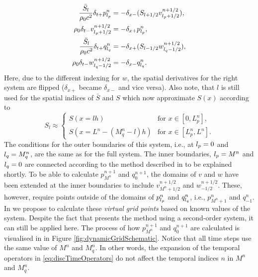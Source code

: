 \begin{subequations}\label{eq:firstOrderPairs}
    \begin{align}
        \frac{\bar S_{l}}{\rho_0 c^2}\delta_{t+}p_{l_p}^n &= -\delta_{x-}(S_{{l}+1/2}v_{{l_p}+1/2}^{n+1/2}),\label{eq:discPressureP}\\
        \rho_0 \delta_{t-}v_{{l_p}+1/2}^{n+1/2}&=-\delta_{x+}p_{l_p}^n,\label{eq:discVelocityV}\\
        \frac{\bar S_{l}}{\rho_0 c^2}\delta_{t+}q_{l_q}^n &= -\delta_{x+}(S_{{l}-1/2}w_{{l_q}-1/2}^{n+1/2}),\label{eq:discPressureQ}\\
        \rho_0 \delta_{t-}w_{{l_q}-1/2}^{n+1/2}&=-\delta_{x-}q_{l_q}^n.\label{eq:discVelocityW}
    \end{align}
\end{subequations}
Here, due to the different indexing for $w$, the spatial derivatives for the right system are flipped ($\delta_{x+}$ became $\delta_{x-}$ and vice versa). Also note, that $l$ is still used for the spatial indices of $\bar S$ and $S$ which now approximate $S(x)$ according to
\begin{equation}
S_l \approx \begin{cases}
     S(x=lh) & \text{for } x\in [0, L_p^n],\\
     S(x=L^n-(M_q^n-l)h) & \text{for } x\in [L_p^n, L^n].
\end{cases}
\end{equation} 
The conditions for the outer boundaries of this system, i.e., at ${l_p} = 0$ and ${l_q} = M_q^n$, are the same as for the full system. The inner boundaries, ${l_p} = M^n$ and ${l_q} = 0$ are connected according to the method described in \cite{Willemsen2021} to be explained shortly.
To be able to calculate $p_{M^n}^{n+1}$ and $q_0^{n+1}$, the domains of $v$ and $w$ have been extended at the inner boundaries to include $v_{M^n+1/2}^{n+1/2}$ and $w_{-1/2}^{n+1/2}$. These, however, require points outside of the domains of $p_{l_p}^n$ and $q_{l_q}^n$, i.e., $p_{M^n+1}^n$ and $q_{-1}^n$. In \cite{Willemsen2021} we propose to calculate these \textit{virtual grid points} based on known values of the system. Despite the fact that \cite{Willemsen2021} presents the method using a second-order system, it can still be applied here. The process of how $p_{M^n}^{n+1}$ and $q_0^{n+1}$ are calculated is visualised in in Figure \ref{fig:dynamicGridSchematic}. Notice that all time steps use the same value of $M^n$ and $M_q^n$. In other words, the expansion of the temporal operators in \eqref{eq:discTimeOperators} do not affect the temporal indices $n$ in $M^n$ and $M_q^n$.

